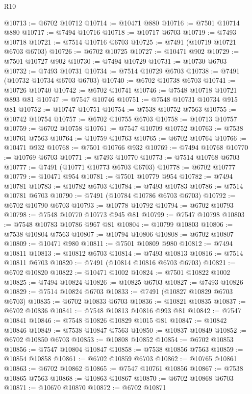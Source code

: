 \begin{lexlean}{R10}
\begin{coremodule}
@10713 := @6702 @10712
@10714 := @10471 @880
@10716 := @7501 @10714 @880
@10717 := @7494 @10716
@10718 := @10717 @6703
@10719 := @7493 @10718
@10721 := @7514 @10716 @6703
@10725 := @7491 (@10719 @10721 @6703 @6703)
@10726 := @6702 @10725
@10727 := @10471 @902
@10729 := @7501 @10727 @902
@10730 := @7494 @10729
@10731 := @10730 @6703
@10732 := @7493 @10731
@10734 := @7514 @10729 @6703
@10738 := @7491 (@10732 @10734 @6703 @6703)
@10740 := @6702 @10738 @6703
@10741 := @10726 @10740
@10742 := @6702 @10741
@10746 := @7548 @10718 @10721 @893 @81
@10747 := @7547 @10746
@10751 := @7548 @10731 @10734 @915 @81
@10752 := @10747 @10751
@10754 := @7538 @10752 @7563
@10755 := @10742 @10754
@10757 := @6702 @10755 @6703
@10758 := @10713 @10757
@10759 := @6702 @10758
@10761 := @7547 @10709 @10752
@10763 := @7538 @10761 @7563
@10764 := @10759 @10763
@10765 := @6702 @10764
@10766 := @10471 @932
@10768 := @7501 @10766 @932
@10769 := @7494 @10768
@10770 := @10769 @6703
@10771 := @7493 @10770
@10773 := @7514 @10768 @6703
@10777 := @7491 (@10771 @10773 @6703 @6703)
@10778 := @6702 @10777
@10779 := @10471 @954
@10781 := @7501 @10779 @954
@10782 := @7494 @10781
@10783 := @10782 @6703
@10784 := @7493 @10783
@10786 := @7514 @10781 @6703
@10790 := @7491 (@10784 @10786 @6703 @6703)
@10792 := @6702 @10790 @6703
@10793 := @10778 @10792
@10794 := @6702 @10793
@10798 := @7548 @10770 @10773 @945 @81
@10799 := @7547 @10798
@10803 := @7548 @10783 @10786 @967 @81
@10804 := @10799 @10803
@10806 := @7538 @10804 @7563
@10807 := @10794 @10806
@10808 := @6702 @10807
@10809 := @10471 @980
@10811 := @7501 @10809 @980
@10812 := @7494 @10811
@10813 := @10812 @6703
@10814 := @7493 @10813
@10816 := @7514 @10811 @6703
@10820 := @7491 (@10814 @10816 @6703 @6703)
@10821 := @6702 @10820
@10822 := @10471 @1002
@10824 := @7501 @10822 @1002
@10825 := @7494 @10824
@10826 := @10825 @6703
@10827 := @7493 @10826
@10829 := @7514 @10824 @6703
@10833 := @7491 (@10827 @10829 @6703 @6703)
@10835 := @6702 @10833 @6703
@10836 := @10821 @10835
@10837 := @6702 @10836
@10841 := @7548 @10813 @10816 @993 @81
@10842 := @7547 @10841
@10846 := @7548 @10826 @10829 @1015 @81
@10847 := @10842 @10846
@10849 := @7538 @10847 @7563
@10850 := @10837 @10849
@10852 := @6702 @10850 @6703
@10853 := @10808 @10852
@10854 := @6702 @10853
@10856 := @7547 @10804 @10847
@10858 := @7538 @10856 @7563
@10859 := @10854 @10858
@10861 := @6702 @10859 @6703
@10862 := @10765 @10861
@10863 := @6702 @10862
@10865 := @7547 @10761 @10856
@10867 := @7538 @10865 @7563
@10868 := @10863 @10867
@10870 := @6702 @10868 @6703
@10871 := @10670 @10870
@10872 := @6702 @10871

\end{coremodule}
\end{lexlean}
